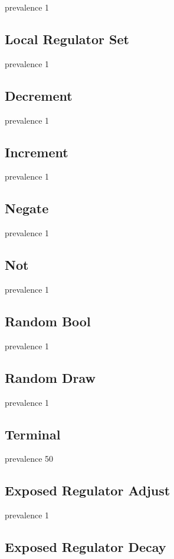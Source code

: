 prevalence 1

\subsection{Local Regulator Set}

prevalence 1

\subsection{Decrement}

prevalence 1

\subsection{Increment}

prevalence 1

\subsection{Negate}

prevalence 1

\subsection{Not}

prevalence 1

\subsection{Random Bool}

prevalence 1

\subsection{Random Draw}

prevalence 1

\subsection{Terminal}

prevalence 50

\subsection{Exposed Regulator Adjust}

prevalence 1

\subsection{Exposed Regulator Decay}

